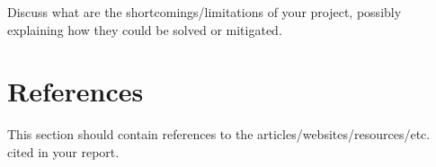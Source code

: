 \documentclass[a4paper,12pt]{article}
\begin{document}
Discuss what are the shortcomings/limitations of
your project, possibly explaining how they could be solved or mitigated.
    
\section{References}

This section should contain references to the articles/websites/resources/etc.
cited in your report.


    \label{lastpage} %
    \newpage
    \rfoot{} %

% 
% 
    

\end{document}
